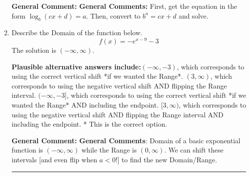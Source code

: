 \documentclass{extbook}[14pt]
\newcommand{\litem}[1]{\item #1

\rule{\textwidth}{0.4pt}}
\begin{document}
\begin{enumerate}
{\textbf{General Comment:} \textbf{General Comments:} First, get the equation in the form $\log_b{(cx+d)} = a$. Then, convert to $b^a = cx+d$ and solve.
}
\litem{
Describe the Domain of the function below.
\[ f(x) = -e^{x-9}-3 \]The solution is \( (-\infty, \infty) \).\begin{enumerate}[label=\Alph*.]
\textbf{Plausible alternative answers include:}$(-\infty, -3)$, which corresponds to using the correct vertical shift *if we wanted the Range*.
$(3, \infty)$, which corresponds to using the negative vertical shift AND flipping the Range interval.
$(-\infty, -3]$, which corresponds to using the correct vertical shift *if we wanted the Range* AND including the endpoint.
$[3, \infty)$, which corresponds to using the negative vertical shift AND flipping the Range interval AND including the endpoint.
* This is the correct option.
\end{enumerate}

\textbf{General Comment:} \textbf{General Comments}: Domain of a basic exponential function is $(-\infty, \infty)$ while the Range is $(0, \infty)$. We can shift these intervals [and even flip when $a<0$!] to find the new Domain/Range.
}
\end{enumerate}
\end{document}

